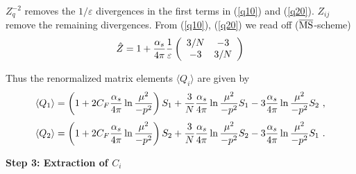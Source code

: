 \documentclass[12pt]{article}
\def\eps{\varepsilon}
\def\as{\alpha_s}
\newcommand{\eqn}{\ref}
\def\aspi{\frac{\as}{4\pi}}
\begin{document}
\begin{itemize}
\begin{itemize}
\begin{itemize}
$Z^{-2}_q$ removes the $1/\varepsilon$ divergences in the
first terms in (\eqn{q10}) and (\eqn{q20}). $Z_{ij}$ remove
the remaining divergences.
From (\eqn{q10}), (\eqn{q20})  we read off 
($\overline{\rm MS}$-scheme)
\begin{equation}\label{zll} \hat Z = 1+ \aspi {1\over\eps}
 \left(\begin{array}{cc}  3/N & -3 \\
                          -3 & 3/N
    \end{array}\right)   \end{equation}

Thus the renormalized matrix elements $\langle Q_i\rangle$
are given by
\begin{equation}\label{q1re}
\langle Q_1\rangle=\left(1+2C_F \aspi\ln{\mu^2\over -p^2}
\right)S_1+{3\over N}\aspi\ln{\mu^2\over -p^2}S_1-
3\aspi\ln{\mu^2\over -p^2} S_2~,   \end{equation}
\begin{equation}\label{q2re}
\langle Q_2\rangle=\left(1+2C_F \aspi\ln{\mu^2\over -p^2}
\right)S_2+{3\over N}\aspi\ln{\mu^2\over -p^2}S_2-
3\aspi\ln{\mu^2\over -p^2} S_1~.   \end{equation}

{\bf Step 3: Extraction of $C_i$}


\end{itemize}
\end{itemize}
\end{itemize}
\end{document}
